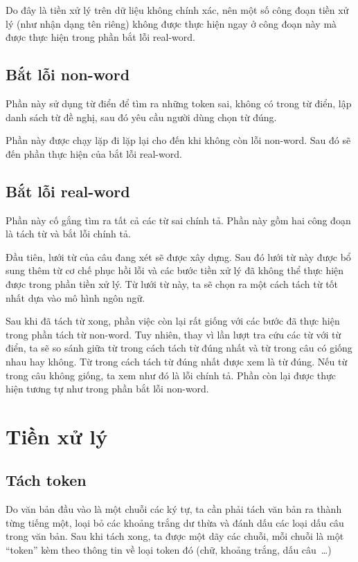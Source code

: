 \documentclass[a4paper,oneside,14pt]{extbook} %
\begin{document}
Do đây là tiền xử lý trên dữ liệu không chính xác, nên một số công
đoạn tiền xử lý (như nhận dạng tên riêng) không được thực hiện ngay ở
công đoạn này mà được thực hiện trong phần bắt lỗi real-word.

\subsection{Bắt lỗi non-word}

Phần này sử dụng từ điển để tìm ra những token sai, không có trong từ
điển, lập danh sách từ đề nghị, sau đó yêu cầu người dùng chọn từ
đúng.

Phần này được chạy lặp đi lặp lại cho đến khi không còn lỗi
non-word. Sau đó sẽ đến phần thực hiện của bắt lỗi real-word.

\subsection{Bắt lỗi real-word}

Phần này cố gắng tìm ra tất cả các từ sai chính tả. Phần này gồm hai
công đoạn là tách từ và bắt lỗi chính tả.

Đầu tiên, lưới từ của câu đang xét sẽ được xây dựng. Sau đó lưới từ
này được bổ sung thêm từ cơ chế phục hồi lỗi và các bước tiền xử lý đã
không thể thực hiện được trong phần tiền xử lý. Từ lưới từ này, ta sẽ
chọn ra một cách tách từ tốt nhất dựa vào mô hình ngôn ngữ.

Sau khi đã tách từ xong, phần việc còn lại rất giống với các bước đã
thực hiện trong phần tách từ non-word. Tuy nhiên, thay vì lần lượt tra cứu
các từ với từ điển, ta sẽ so sánh giữa từ trong cách tách từ đúng nhất
và từ trong câu có giống nhau hay không. Từ trong cách tách từ đúng
nhất được xem là từ đúng. Nếu từ trong câu không giống, ta xem như đó
là lỗi chính tả. Phần còn lại được thực hiện tương tự như trong phần
bắt lỗi non-word.


\section{Tiền xử lý}


\subsection{Tách token}
\label{sec:preprocess:token}

Do văn bản đầu vào là một chuỗi các ký tự, ta cần phải tách văn bản ra
thành từng tiếng một, loại bỏ các khoảng trắng dư thừa và đánh dấu các
loại dấu câu trong văn bản. Sau khi tách xong, ta được một dãy các
chuỗi, mỗi chuỗi là một ``token'' kèm theo thông tin về loại token đó
(chữ, khoảng trắng, dấu câu~\ldots)
\end{document}
